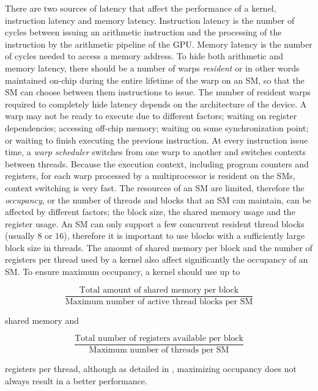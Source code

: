 \documentclass{ws-ijait}
\begin{document}
There are two sources of latency that affect the performance of a kernel, instruction latency and memory latency. Instruction latency is the number of cycles between issuing an arithmetic instruction and the processing of the instruction by the arithmetic pipeline of the GPU. Memory latency is the number of cycles needed to access a memory address. To hide both arithmetic and memory latency, there should be a number of warps \textit{resident} or in other words maintained on-chip during the entire lifetime of the warp on an SM, so that the SM can choose between them instructions to issue. The number of resident warps required to completely hide latency depends on the architecture of the device. A warp may not be ready to execute due to different factors; waiting on register dependencies; accessing off-chip memory; waiting on some synchronization point; or waiting to finish executing the previous instruction. At every instruction issue time, a \textit{warp scheduler} switches from one warp to another and switches contexts between threads. Because the execution context, including program counters and registers, for each warp processed by a multiprocessor is resident on the SMs, context switching is very fast. The resources of an SM are limited, therefore the \textit{occupancy}, or the number of threads and blocks that an SM can maintain, can be affected by different factors; the block size, the shared memory usage and the register usage. An SM can only support a few concurrent resident thread blocks (usually $8$ or $16$), therefore it is important to use blocks with a sufficiently large block size in threads. The amount of shared memory per block and the number of registers per thread used by a kernel also affect significantly the occupancy of an SM. To ensure maximum occupancy, a kernel should use up to

\begin{equation}
\frac{\textrm{Total amount of shared memory per block}}{\textrm{Maximum number of active thread blocks per SM}}
\end{equation}

\noindent
shared memory and 

\begin{equation}
\frac{\textrm{Total number of registers available per block}}{\textrm{Maximum number of threads per SM}}
\end{equation}

\noindent
registers per thread, although as detailed in \cite{Volkov2010}, maximizing occupancy does not always result in a better performance.
\end{document}
